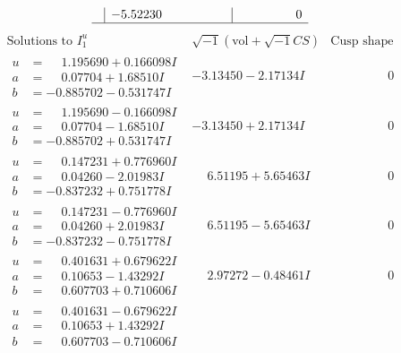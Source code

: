 \documentclass[1p]{elsarticle_modified}
\theoremstyle{definition}
\newcommand{\I}{\sqrt{-1}}
\begin{document}
$$\begin{array}{c|c|c}
 & -5.52230\phantom{ +0.000000I} & \phantom{-0.000000 } 0\\
 \hline 
 \end{array}$$\newpage$$\begin{array}{c|c|c}  
\text{Solutions to }I^u_{1}& \I (\text{vol} + \sqrt{-1}CS) & \text{Cusp shape}\\
 \hline 
\begin{aligned}
u &= \phantom{-}1.195690 + 0.166098 I \\
a &= \phantom{-}0.07704 + 1.68510 I \\
b &= -0.885702 - 0.531747 I\end{aligned}
 & -3.13450 - 2.17134 I & \phantom{-0.000000 } 0 \\ \hline\begin{aligned}
u &= \phantom{-}1.195690 - 0.166098 I \\
a &= \phantom{-}0.07704 - 1.68510 I \\
b &= -0.885702 + 0.531747 I\end{aligned}
 & -3.13450 + 2.17134 I & \phantom{-0.000000 } 0 \\ \hline\begin{aligned}
u &= \phantom{-}0.147231 + 0.776960 I \\
a &= \phantom{-}0.04260 - 2.01983 I \\
b &= -0.837232 + 0.751778 I\end{aligned}
 & \phantom{-}6.51195 + 5.65463 I & \phantom{-0.000000 } 0 \\ \hline\begin{aligned}
u &= \phantom{-}0.147231 - 0.776960 I \\
a &= \phantom{-}0.04260 + 2.01983 I \\
b &= -0.837232 - 0.751778 I\end{aligned}
 & \phantom{-}6.51195 - 5.65463 I & \phantom{-0.000000 } 0 \\ \hline\begin{aligned}
u &= \phantom{-}0.401631 + 0.679622 I \\
a &= \phantom{-}0.10653 - 1.43292 I \\
b &= \phantom{-}0.607703 + 0.710606 I\end{aligned}
 & \phantom{-}2.97272 - 0.48461 I & \phantom{-0.000000 } 0 \\ \hline\begin{aligned}
u &= \phantom{-}0.401631 - 0.679622 I \\
a &= \phantom{-}0.10653 + 1.43292 I \\
b &= \phantom{-}0.607703 - 0.710606 I\end{aligned}

\end{array}$$
\end{document}
